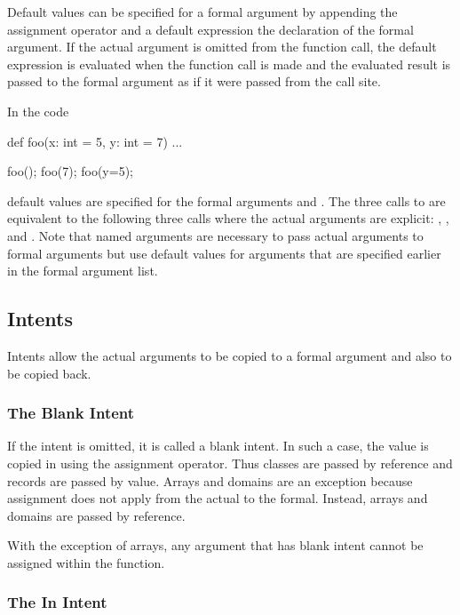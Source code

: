Default values can be specified for a formal argument by appending the
assignment operator and a default expression the declaration of the
formal argument.  If the actual argument is omitted from the function
call, the default expression is evaluated when the function call is
made and the evaluated result is passed to the formal argument as if
it were passed from the call site.

\begin{example}
In the code
\begin{chapel}
def foo(x: int = 5, y: int = 7) { ... }

foo();
foo(7);
foo(y=5);
\end{chapel}
default values are specified for the formal arguments 
and .  The three calls to  are equivalent to the
following three calls where the actual arguments are
explicit: , , and .
Note that named arguments are necessary to pass actual arguments to
formal arguments but use default values for arguments that are
specified earlier in the formal argument list.
\end{example}

\subsection{Intents}
\label{Intents}

Intents allow the actual arguments to be copied to a formal argument
and also to be copied back.

\subsubsection{The Blank Intent}
\label{The_Blank_Intent}

If the intent is omitted, it is called a blank intent.  In such a
case, the value is copied in using the assignment operator.  Thus
classes are passed by reference and records are passed by value.
Arrays and domains are an exception because assignment does not apply
from the actual to the formal.  Instead, arrays and domains are passed
by reference.

With the exception of arrays, any argument that has blank intent
cannot be assigned within the function.

\subsubsection{The In Intent}
\label{The_In_Intent}


